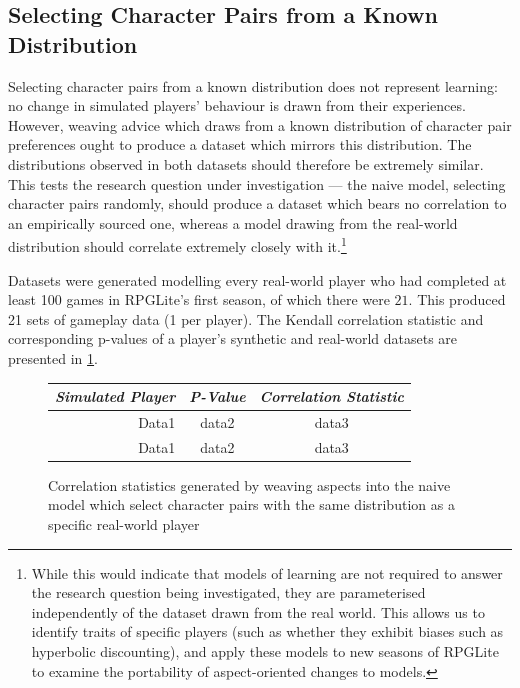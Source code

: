 



\subsection{Selecting Character Pairs from a Known Distribution}

Selecting character pairs from a known distribution does not represent learning:
no change in simulated players' behaviour is drawn from their experiences.
However, weaving advice which draws from a known distribution of character pair
preferences ought to produce a dataset which mirrors this distribution. The
distributions observed in both datasets should therefore be extremely similar.
This tests the research question under investigation --- the naive model,
selecting character pairs randomly, should produce a dataset which bears no
correlation to an empirically sourced one, whereas a model drawing from the
real-world distribution should correlate extremely closely with
it.\footnote{While this would indicate that models of learning are not required
  to answer the research question being investigated, they are parameterised
  independently of the dataset drawn from the real world. This allows us to
  identify traits of specific players (such as whether they exhibit biases such
  as hyperbolic discounting), and apply these models to new seasons of RPGLite
  to examine the portability of aspect-oriented changes to models.
  }

Datasets were generated modelling every real-world player who had completed at
least 100 games in RPGLite's first season, of which there were $21$. This
produced 21 sets of gameplay data (1 per player). The Kendall \tau correlation
statistic and corresponding p-values of a player's synthetic and real-world
datasets are presented in \cref{fig:known_distribution_results_s1}.

\begin{figure}[h]
\begin{center}
  \begin{tabular}{r|c|c}
    \emph{Simulated Player} & \emph{P-Value} & \emph{Correlation Statistic} \\ \hline\hline
    Data1 & data2 & data3 \\
    Data1 & data2 & data3 \\
  \end{tabular}
  \caption{Correlation statistics generated by weaving aspects into the naive
    model which select character pairs with the same distribution as a specific
    real-world player}
  \label{fig:known_distribution_results_s1}
\end{center}
\end{figure}

